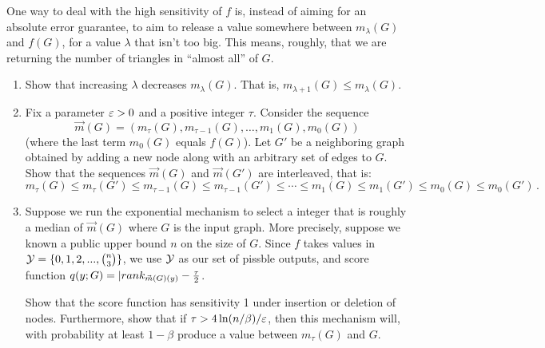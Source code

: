 \documentclass[11pt]{article}
\begin{document}
\begin{enumerate}[leftmargin=\parindent, itemsep=3ex]
\begin{enumerate}
    One way to deal with the high sensitivity of $f$ is, instead of aiming for an absolute error guarantee, to aim to release a value somewhere between $m_\lambda(G)$ and $f(G)$, for a value $\lambda$ that isn't too big. This means, roughly, that we are returning the number of triangles in ``almost all'' of $G$.



    \begin{enumerate}
      \item Show that increasing $\lambda$ decreases $m_\lambda(G)$. That is, $m_{\lambda+1}(G) \leq m_\lambda(G)$.
      \item Fix a parameter $\varepsilon>0$ and a positive integer $\tau$. Consider the sequence
      $$\vec m(G) = (m_\tau(G), m_{\tau-1}(G), \dots , m_1(G), m_0(G))$$
      (where the last term $m_0(G)$ equals $f(G)$). Let $G'$ be a neighboring graph obtained by adding a new node along with an arbitrary set of edges to $G$. Show that the sequences $\vec m (G)$ and $\vec m (G')$ are interleaved, that is: 
      $$m_\tau(G) \leq m_\tau(G')\leq m_{\tau-1}(G) \leq  m_{\tau-1}(G') \leq \cdots \leq m_1(G) \leq m_1(G') \leq m_0(G) \leq m_0(G') \, .$$
      \item Suppose  we run the exponential mechanism to select a integer that is roughly a median of $\vec m(G)$ where $G$ is the input graph. More precisely, suppose we known a public upper bound $n$ on the size of $G$. Since $f$ takes values in $\mathcal{Y} = \{0,1,2,...,\binom n 3\}$, we use $\mathcal{Y}$ as our set of pissble outputs, and score function $q(y;G) = |rank_{\vec m(G)(y)} - \frac \tau 2$. 
      
      Show that the score function has sensitivity 1 under insertion or deletion of nodes. Furthermore, show that if $\tau > 4\ln(n/\beta)/\varepsilon$, then this mechanism will, with probability at least $1-\beta$ produce a value between $m_\tau(G)$ and $G$. 

    \end{enumerate}

    \end{enumerate}


\end{enumerate}
\end{document}

